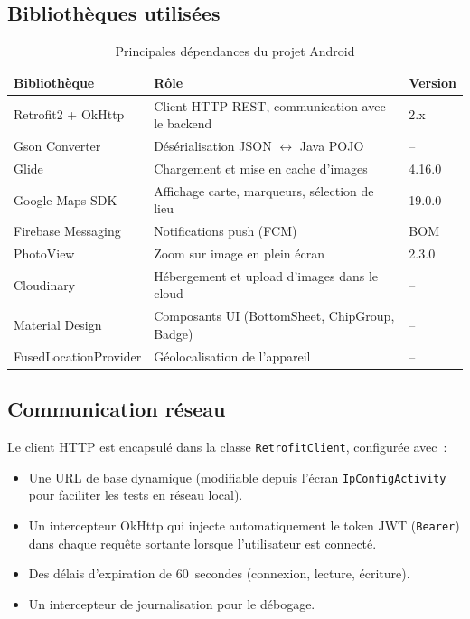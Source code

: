 \documentclass[12pt, a4paper, openany]{report}
\begin{document}
\subsection{Bibliothèques utilisées}

\begin{table}[H]
\centering
\caption{Principales dépendances du projet Android}
\begin{tabularx}{\textwidth}{lXl}
\toprule
\rowcolor{primary!15}
\textbf{Bibliothèque} & \textbf{Rôle} & \textbf{Version} \\
\midrule
Retrofit2 + OkHttp      & Client HTTP REST, communication avec le backend & 2.x \\
Gson Converter          & Désérialisation JSON $\leftrightarrow$ Java POJO & -- \\
Glide                   & Chargement et mise en cache d'images & 4.16.0 \\
Google Maps SDK         & Affichage carte, marqueurs, sélection de lieu & 19.0.0 \\
Firebase Messaging      & Notifications push (FCM) & BOM \\
PhotoView               & Zoom sur image en plein écran & 2.3.0 \\
Cloudinary              & Hébergement et upload d'images dans le cloud & -- \\
Material Design         & Composants UI (BottomSheet, ChipGroup, Badge) & -- \\
FusedLocationProvider   & Géolocalisation de l'appareil & -- \\
\bottomrule
\end{tabularx}
\end{table}

\subsection{Communication réseau}

Le client HTTP est encapsulé dans la classe \texttt{RetrofitClient}, configurée avec~:
\begin{itemize}
  \item Une URL de base dynamique (modifiable depuis l'écran \texttt{IpConfigActivity}
        pour faciliter les tests en réseau local).
  \item Un intercepteur OkHttp qui injecte automatiquement le token JWT (\texttt{Bearer})
        dans chaque requête sortante lorsque l'utilisateur est connecté.
  \item Des délais d'expiration de 60~secondes (connexion, lecture, écriture).
  \item Un intercepteur de journalisation pour le débogage.
\end{itemize}
\end{document}
